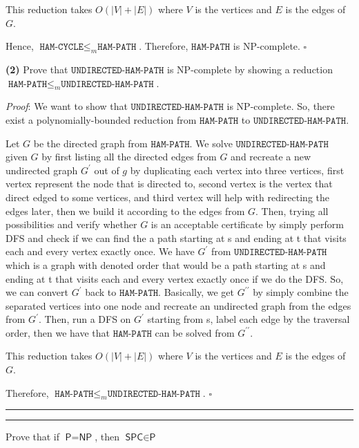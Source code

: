 \documentclass[a4paper, 11pt]{article}
\newcommand{\question}[2] {\vspace{.25in} \hrule\vspace{0.5em}
	\noindent{\bf #1: #2} \vspace{0.5em}
	\hrule \vspace{.10in}}
\renewcommand{\part}[1] {\vspace{.10in} {\bf (#1)}}
\begin{document}
	This reduction takes $O(|V|+|E|)$ where $V$ is the vertices and $E$ is the edges of $G$.
	
	Hence, $\texttt{HAM-CYCLE} \leq_m \texttt{HAM-PATH}$. Therefore, $\texttt{HAM-PATH}$ is NP-complete. $\square$

	
	\part{2} Prove that $\texttt{UNDIRECTED-HAM-PATH}$ is NP-complete by showing a reduction $\texttt{HAM-PATH} \leq_m \texttt{UNDIRECTED-HAM-PATH}$.
	
	
	{\em Proof}: We want to show that $\texttt{UNDIRECTED-HAM-PATH}$ is NP-complete. So, there exist a polynomially-bounded reduction from $\texttt{HAM-PATH}$ to $\texttt{UNDIRECTED-HAM-PATH}$. 
	
	Let $G$ be the directed graph from $\texttt{HAM-PATH}$. We solve $\texttt{UNDIRECTED-HAM-PATH}$ given $G$ by first listing all the directed edges from $G$ and recreate a new undirected graph $G^\prime$ out of $g$ by duplicating each vertex into three vertices, first vertex represent the node that is directed to, second vertex is the vertex that direct edged to some vertices, and third vertex will help with redirecting the edges later, then we build it according to the edges from $G$. Then, trying all possibilities and verify whether $G$ is an acceptable certificate by simply perform DFS and check if we can find the a path starting at s and ending at t that visits each and every vertex exactly once. We have $G^\prime$ from $\texttt{UNDIRECTED-HAM-PATH}$ which is a graph with denoted order that would be a path starting at s and ending at t that visits each and every vertex exactly once if we do the DFS. So, we can convert $G^\prime$ back to $\texttt{HAM-PATH}$. Basically, we get $G^{\prime \prime}$ by simply combine the separated vertices into one node and recreate an undirected graph from the edges from $G^\prime$. Then, run a DFS on $G^\prime$ starting from s, label each edge by the traversal order, then we have that $\texttt{HAM-PATH}$ can be solved from $G^{\prime \prime}$.
	
	This reduction takes $O(|V|+|E|)$ where $V$ is the vertices and $E$ is the edges of $G$.
	
	Therefore, $\texttt{HAM-PATH} \leq_m \texttt{UNDIRECTED-HAM-PATH}$. $\square$
	
	\question{5}{Silver Lining If P = NP}
	
	Prove that if $\textsf{P} = \textsf{NP}$, then $\textsf{SPC} \in \textsf{P}$
	
\end{document}
